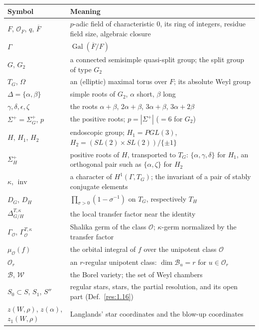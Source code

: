 \documentclass[12pt,letterpaper]{amsart}
\theoremstyle{plain}
\theoremstyle{definition}
\theoremstyle{remark}
\theoremstyle{definition}
\newcommand{\ovF}{\overline{F}}
\newcommand{\OF}{\mathcal{O}_F}
\newcommand{\ooo}{\mathcal{O}}
\DeclareMathOperator{\Gal}{Gal}
\DeclareMathOperator{\inv}{inv}
\begin{document}
\begingroup
\renewcommand{\arraystretch}{1.25}
\begin{longtable}{p{}p{}}
\toprule
Symbol & Meaning\\
\midrule
\endhead
$F$, $\OF$, $q$, $\ovF$ & $p$-adic field of characteristic $0$, its ring of integers, residue field size, algebraic closure\\
$\Gamma$ & $\Gal(\ovF/F)$\\
$G$, $G_2$ & a connected semisimple quasi-split group; the split group of type $G_2$\\
$T_G$, $\Omega$ & an (elliptic) maximal torus over $F$; its absolute Weyl group\\
$\Delta=\{\alpha,\beta\}$ & simple roots of $G_2$, $\alpha$ short, $\beta$ long\\
$\gamma,\delta,\epsilon,\zeta$ & the roots $\alpha+\beta$, $2\alpha+\beta$, $3\alpha+\beta$, $3\alpha+2\beta$\\
$\Sigma^+=\Sigma_G^+$, $p$ & the positive roots; $p=|\Sigma^+|$ ($=6$ for $G_2$)\\
$H$, $H_1$, $H_2$ & endoscopic group; $H_1=PGL(3)$, $H_2=(SL(2)\times SL(2))/\{\pm1\}$\\
$\Sigma_H^+$ & positive roots of $H$, transported to $T_G$: $\{\alpha,\gamma,\delta\}$ for $H_1$, an orthogonal pair such as $\{\alpha,\zeta\}$ for $H_2$\\
$\kappa$, $\inv$ & a character of $H^1(\Gamma,T_G)$; the invariant of a pair of stably conjugate elements\\
$D_G$, $D_H$ & $\prod_{\sigma>0}(1-\sigma^{-1})$ on $T_G$, respectively $T_H$\\
$\Delta_{G/H}^{T,\kappa}$ & the local transfer factor near the identity\\
$\Gamma_\ooo$, $\Gamma_\ooo^{T,\kappa}$ & Shalika germ of the class $\ooo$; $\kappa$-germ normalized by the transfer factor\\
$\mu_\ooo(f)$ & the orbital integral of $f$ over the unipotent class $\ooo$\\
$\ooo_r$ & an $r$-regular unipotent class: $\dim{\mathcal B}_u=r$ for $u\in\ooo_r$\\
${\mathcal B}$, ${\mathcal W}$ & the Borel variety; the set of Weyl chambers\\
$S_0\subset S$, $S_1$, $S''$ & regular stars, stars, the partial resolution, and its open part (Def.~\ref{res:1.16})\\
$z(W,\rho)$, $z(\alpha)$, $z_1(W,\rho)$ & Langlands' star coordinates and the blow-up coordinates\\

\end{longtable}
\end{document}
